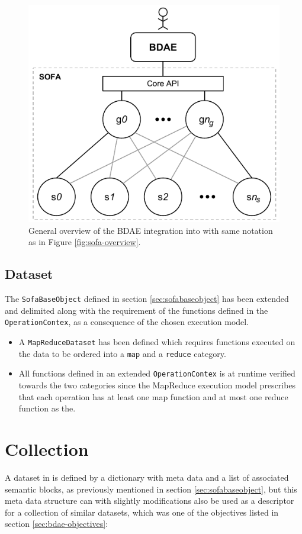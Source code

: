 \begin{figure}
	\centering
	\includegraphics[scale=0.9]{pdf/bdae-overview.pdf}
	\caption[General overview of the BDAE]{General overview of the BDAE integration into \CodeName with same notation as in Figure \ref{fig:sofa-overview}. \label{fig:bdae-overview}}
\end{figure}	


\subsection{Dataset}
The \texttt{SofaBaseObject} defined in section \ref{sec:sofabaseobject} has been extended and delimited along with the requirement of the functions defined in the \texttt{OperationContex}, as a consequence of the chosen execution model. 
\begin{itemize}
	\item A \texttt{MapReduceDataset} has been defined which requires functions executed on the data to be ordered into a \texttt{map} and a \texttt{reduce} category. 
	\item All functions defined in an extended \texttt{OperationContex} is at runtime verified towards the two categories since the MapReduce execution model prescribes that each operation has at least one map function and at most one reduce function as the.
\end{itemize}

\section{Collection}
A dataset in \CodeName is defined by a dictionary with meta data and a list of associated semantic blocks, as previously mentioned in section \ref{sec:sofabaseobject}, but this meta data structure can with slightly modifications also be used as a descriptor for a collection of similar datasets, which was one of the objectives listed in section \ref{sec:bdae-objectives}:

